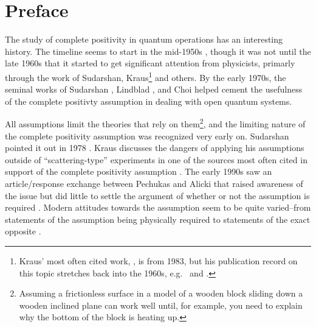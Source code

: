 \newpage
\chapter*{Preface}
The study of complete positivity in quantum operations has an interesting history.  The timeline seems to start in the mid-1950s \cite{Stinespring1955}, though it was not until the late 1960s that it started to get significant attention from physicists, primarly through the work of Sudarshan, Kraus\footnote{Kraus' most often cited work, \cite{Kraus1983}, is from 1983, but his publication record on this topic stretches back into the 1960s, e.g.\ \cite{Kraus1971} and \cite{Kraus1969}.} and others.  By the early 1970s, the seminal works of Sudarshan \cite{Sudarshan1976}, Lindblad \cite{Lindblad1976}, and Choi \cite{Choi1975} helped cement the usefulness of the complete positivty assumption in dealing with open quantum systems.  

All assumptions limit the theories that rely on them\footnote{Assuming a frictionless surface in a model of a wooden block sliding down a wooden inclined plane can work well until, for example, you need to explain why the bottom of the block is heating up.}, and the limiting nature of the complete positivity assumption was recognized very early on.  Sudarshan pointed it out in 1978 \cite{Sudarshan1978}.  Kraus discusses the dangers of applying his assumptions outside of ``scattering-type'' experiments in one of the sources most often cited in support of the complete positivity assumption \cite{Kraus1983}.  The early 1990s saw an article/response exchange between Pechukas and Alicki that raised awareness of the issue but did little to settle the argument of whether or not the assumption is required \cite{Pechukas1994,Alicki1995,Pechukas1995}.  Modern attitudes towards the assumption seem to be quite varied--from statements of the assumption being physically required \cite{Benatti2005,Alicki2001} to statements of the exact opposite \cite{Sudarshan2005}. 

